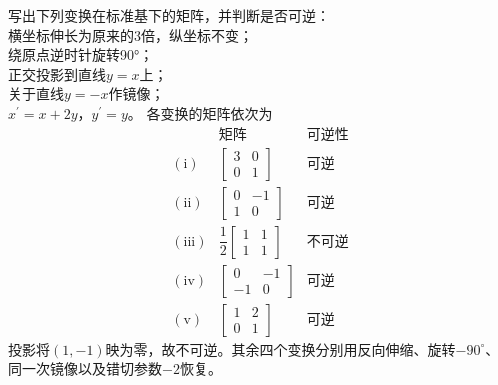 写出下列变换在标准基下的矩阵，并判断是否可逆：\\
横坐标伸长为原来的\(3\)倍，纵坐标不变；\\
绕原点逆时针旋转90°；\\
正交投影到直线\(y = x\)上；\\
关于直线\(y = - x\)作镜像；\\
\(x^{\prime} = x + 2 y\)，\(y^{\prime} = y\)。
\solutionanswer
各变换的矩阵依次为
\[
\begin{array}{c|c|c}
&\text{矩阵}&\text{可逆性}\\ \hline
\mathrm{(i)}&\begin{bmatrix}3&0\\0&1\end{bmatrix}&\text{可逆}\\[6pt]
\mathrm{(ii)}&\begin{bmatrix}0&-1\\1&0\end{bmatrix}&\text{可逆}\\[6pt]
\mathrm{(iii)}&\dfrac12\begin{bmatrix}1&1\\1&1\end{bmatrix}&\text{不可逆}\\[6pt]
\mathrm{(iv)}&\begin{bmatrix}0&-1\\-1&0\end{bmatrix}&\text{可逆}\\[6pt]
\mathrm{(v)}&\begin{bmatrix}1&2\\0&1\end{bmatrix}&\text{可逆}
\end{array}
\]
投影将\((1,-1)\)映为零，故不可逆。其余四个变换分别用反向伸缩、旋转\(-90^\circ\)、同一次镜像以及错切参数\(-2\)恢复。


